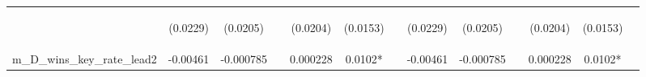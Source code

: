 \documentclass[]{article}
\begin{document}
\begin{center}
\begin{tabular}{lcccccccccccc}
\vspace{4pt} & \begin{footnotesize}(0.0229)\end{footnotesize} & \begin{footnotesize}(0.0205)\end{footnotesize} & \begin{footnotesize}\end{footnotesize} & \begin{footnotesize}(0.0204)\end{footnotesize} & \begin{footnotesize}(0.0153)\end{footnotesize} & \begin{footnotesize}\end{footnotesize} & \begin{footnotesize}(0.0229)\end{footnotesize} & \begin{footnotesize}(0.0205)\end{footnotesize} & \begin{footnotesize}\end{footnotesize} & \begin{footnotesize}(0.0204)\end{footnotesize} & \begin{footnotesize}(0.0153)\end{footnotesize} & \begin{footnotesize}\end{footnotesize} \\
m\_D\_wins\_key\_rate\_lead2 & -0.00461 & -0.000785 &  & 0.000228 & 0.0102* &  & -0.00461 & -0.000785 &  & 0.000228 & 0.0102* &  \\

\end{tabular}
\end{center}
\end{document}
